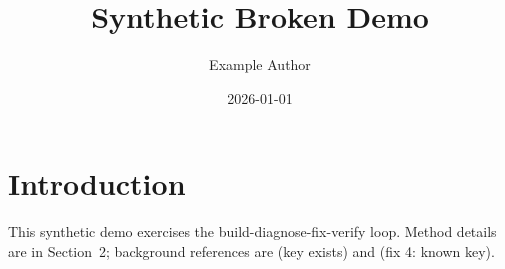 \documentclass[11pt]{article}
\title{Synthetic Broken Demo}
\author{Example Author}
\date{2026-01-01}
\begin{document}
\maketitle
\section{Introduction}
This synthetic demo exercises the build-diagnose-fix-verify loop.
Method details are in Section~2; background references are
\cite{knuth1984} (key exists) and \cite{lamport1986} (fix 4: known key).



\end{document}
